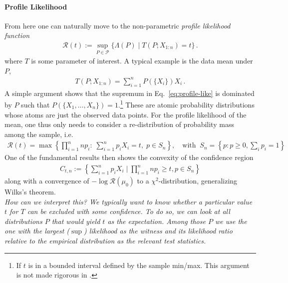\documentclass{article}
\begin{document}
\paragraph{Profile Likelihood} 
From here one can naturally move to the non-parametric \textit{profile likelihood function}
\begin{align}
\label{eq:profile-like}
\mathcal R(t) := \sup_{P \in \mathcal P} \{ \Lambda (P) \mid T(P; X_{1:n}) = t \} \,.
\end{align}
where $T$ is some parameter of interest. A typical example is the data mean under $P$, 
\begin{align}
T(P; X_{1:n}) = \sum_{i=1}^n P(\{ X_i\}) X_i  \,.
\end{align}
%
A simple argument shows that the supremum in Eq.~\eqref{eq:profile-like} is dominated by $P$ such that $P(\{X_1,\dots,X_n\})=1$.\footnote{If $t$ is in a bounded interval defined by the sample min/max. This argument is not made  rigorous in \cite{owen2001empirical}.} These are atomic probability distributions whose atoms are just the observed data points. For the profile likelihood of the mean, one thus only needs to consider a re-distribution of probability mass among the sample, i.e.
\begin{align}
\label{eq:profile-mean-max}
\mathcal R(t) = \max\left\{ \prod_{i=1}^n n p_i: \; \sum_{i=1}^n p_i X_i = t, \; p \in S_n\right\},  
\quad \text{with} \;\; S_n = \left\{ p: p \ge 0, \sum_i p_i=1\right\}
\end{align}
%
One of the fundamental results \cite[Theorem 3.2]{owen2001empirical} then shows the convexity of the confidence region 
\begin{align}
C_{t,n} := \left\{  \sum_{i=1}^n p_i X_i \mid \prod_{i=1}^n n p_i \ge t, p \in S_n\right\} 
\end{align}
along with a convergence of $-\log \mathcal R(\mu_0)$ to a $\chi^2$-distribution, generalizing Wilks's theorem. \\

\textit{How can we interpret this? We typically want to know whether a particular value $t$ for  $T$ can be excluded with some confidence. To do so, we can look at all distributions $P$ that would yield $t$ as the expectation. Among those $P$ we use the one with the largest ($\sup$) likelihood as the witness and its likelihood ratio relative to the empirical distribution as the relevant test statistics.}
\end{document}
